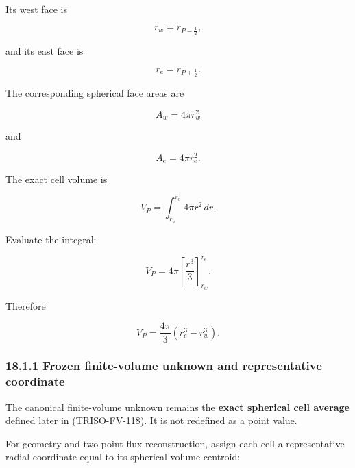 \documentclass[11pt,a4paper]{article}
\begin{document}
Its west face is

\begin{equation}
r_w=r_{P-\frac12},
\tag{TRISO-FV-102}
\label{eq:triso-fv-102}
\end{equation}

and its east face is

\begin{equation}
r_e=r_{P+\frac12}.
\tag{TRISO-FV-103}
\label{eq:triso-fv-103}
\end{equation}

The corresponding spherical face areas are

\begin{equation}
\boxed{
A_w=4\pi r_w^2
}
\tag{TRISO-FV-104}
\label{eq:triso-fv-104}
\end{equation}

and

\begin{equation}
\boxed{
A_e=4\pi r_e^2.
}
\tag{TRISO-FV-105}
\label{eq:triso-fv-105}
\end{equation}

The exact cell volume is

\begin{equation}
V_P
=
\int_{r_w}^{r_e}4\pi r^2\,dr.
\tag{TRISO-FV-106}
\label{eq:triso-fv-106}
\end{equation}

Evaluate the integral:

\begin{equation}
V_P
=
4\pi
\left[
\frac{r^3}{3}
\right]_{r_w}^{r_e}.
\tag{TRISO-FV-107}
\label{eq:triso-fv-107}
\end{equation}

Therefore

\begin{equation}
\boxed{
V_P
=
\frac{4\pi}{3}
\left(
r_e^3-r_w^3
\right).
}
\tag{TRISO-FV-108}
\label{eq:triso-fv-108}
\end{equation}

\subsubsection*{18.1.1 Frozen finite-volume unknown and representative coordinate}

The canonical finite-volume unknown remains the \textbf{exact spherical cell average} defined later in (TRISO-FV-118). It is not redefined as a point value.

For geometry and two-point flux reconstruction, assign each cell a representative radial coordinate equal to its spherical volume centroid:
\end{document}
